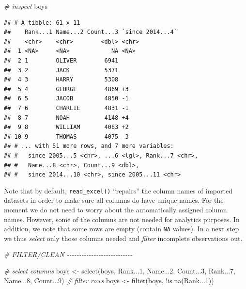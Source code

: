 \documentclass[
  12pt,
]{style/krantz}
\newenvironment{Shaded}{\begin{snugshade}}{\end{snugshade}}
\newcommand{\CommentTok}[1]{\textcolor[rgb]{0.56,0.35,0.01}{\textit{#1}}}
\newcommand{\DecValTok}[1]{\textcolor[rgb]{0.00,0.00,0.81}{#1}}
\newcommand{\FunctionTok}[1]{\textcolor[rgb]{0.00,0.00,0.00}{#1}}
\newcommand{\NormalTok}[1]{#1}
\newcommand{\OtherTok}[1]{\textcolor[rgb]{0.56,0.35,0.01}{#1}}
\newcommand{\SpecialCharTok}[1]{\textcolor[rgb]{0.00,0.00,0.00}{#1}}
\begin{document}
\begin{Shaded}
\begin{Highlighting}[]
\CommentTok{\# inspect}
\NormalTok{boys}
\end{Highlighting}
\end{Shaded}

\begin{verbatim}
## # A tibble: 61 x 11
##    Rank...1 Name...2 Count...3 `since 2014...4`
##    <chr>    <chr>        <dbl> <chr>           
##  1 <NA>     <NA>            NA <NA>            
##  2 1        OLIVER        6941 ­                
##  3 2        JACK          5371 ­                
##  4 3        HARRY         5308 ­                
##  5 4        GEORGE        4869 +3              
##  6 5        JACOB         4850 -1              
##  7 6        CHARLIE       4831 -1              
##  8 7        NOAH          4148 +4              
##  9 8        WILLIAM       4083 +2              
## 10 9        THOMAS        4075 -3              
## # ... with 51 more rows, and 7 more variables:
## #   since 2005...5 <chr>, ...6 <lgl>, Rank...7 <chr>,
## #   Name...8 <chr>, Count...9 <dbl>,
## #   since 2014...10 <chr>, since 2005...11 <chr>
\end{verbatim}

Note that by default, \texttt{read\_excel()} ``repairs'' the column names of imported datasets in order to make sure all columns do have unique names. For the moment we do not need to worry about the automatically assigned column names. However, some of the columns are not needed for analytics purposes. In addition, we note that some rows are empty (contain \texttt{NA} values). In a next step we thus \emph{select} only those columns needed and \emph{filter} incomplete observations out.

\begin{Shaded}
\begin{Highlighting}[]
\CommentTok{\# FILTER/CLEAN {-}{-}{-}{-}{-}{-}{-}{-}{-}{-}{-}{-}{-}{-}{-}{-}{-}{-}{-}{-}{-}{-}{-}{-}{-}{-}{-}}

\CommentTok{\# select columns}
\NormalTok{boys }\OtherTok{\textless{}{-}} \FunctionTok{select}\NormalTok{(boys, Rank...}\DecValTok{1}\NormalTok{, Name...}\DecValTok{2}\NormalTok{, Count...}\DecValTok{3}\NormalTok{, Rank...}\DecValTok{7}\NormalTok{, Name...}\DecValTok{8}\NormalTok{, Count...}\DecValTok{9}\NormalTok{)}
\CommentTok{\# filter rows}
\NormalTok{boys }\OtherTok{\textless{}{-}}  \FunctionTok{filter}\NormalTok{(boys, }\SpecialCharTok{!}\FunctionTok{is.na}\NormalTok{(Rank...}\DecValTok{1}\NormalTok{))}
\end{Highlighting}
\end{Shaded}
\end{document}
